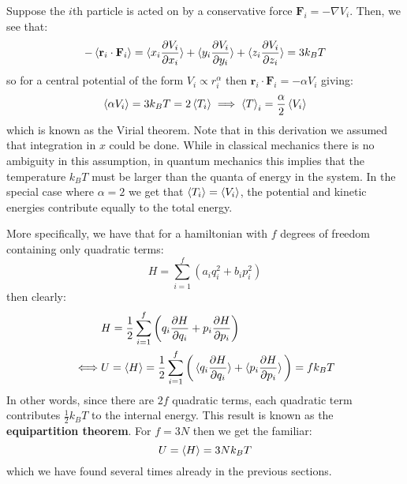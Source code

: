 \documentclass[a4paper,11pt,oneside]{book}
\begin{document}
Suppose the $i$th particle is acted on by a conservative force $\textbf{F}_i = - \nabla V_i$. Then, we see that:
\begin{equation}
    -\braket{\textbf{r}_i\cdot \textbf{F}_i} = \braket{x_i \frac{\partial V_i}{\partial x_i}}+\braket{y_i \frac{\partial V_i}{\partial y_i}}+\braket{z_i \frac{\partial V_i}{\partial z_i}} = 3k_B T
\end{equation}
so for a central potential of the form $V_i \propto r_i^\alpha$ then $\textbf{r}_i \cdot \textbf{F}_i = - \alpha V_i$ giving:
\begin{equation}
    \braket{\alpha V_i} = 3k_B T = 2\braket{T_i} \implies \braket{T}_i = \frac{\alpha}{2} \braket{V_i}
\end{equation}
which is known as the Virial theorem. Note that in this derivation we assumed that integration in $x$ could be done. While in classical mechanics there is no ambiguity in this assumption, in quantum mechanics this implies that the temperature $k_BT$ must be larger than the quanta of energy in the system. In the special case where $\alpha=2$ we get that $\braket{T_i}=\braket{V_i}$, the potential and kinetic energies contribute equally to the total energy.

More specifically, we have that for a hamiltonian with $f$ degrees of freedom containing only quadratic terms:
\begin{equation}
    H = \sum_{i=1}^{f}(a_iq_i^2+b_ip_i^2)
\end{equation}
then clearly:
\begin{align}
    &H = \frac{1}{2}\sum_{i=1}^{f}\bigg(q_i\frac{\partial H}{\partial q_i}+p_i\frac{\partial H}{\partial p_i}\bigg)\\
\iff &U =\braket{H} = \frac{1}{2}\sum_{i=1}^f\bigg(\braket{q_i\frac{\partial H}{\partial q_i}}+\braket{p_i\frac{\partial H}{\partial p_i}}\bigg) = fk_B T 
\end{align}
In other words, since there are $2f$ quadratic terms, each quadratic term contributes $\frac{1}{2}k_B T$ to the internal energy. This result is known as the \textbf{equipartition theorem}. For $f=3N$ then we get the familiar:
\begin{equation}
    U=\braket{H} = 3Nk_B T
\end{equation}
which we have found several times already in the previous sections.
\end{document}
